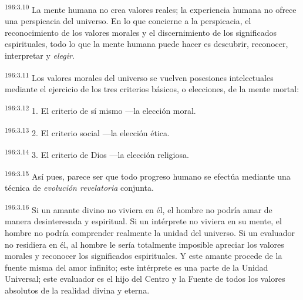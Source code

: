 \par 
\textsuperscript{196:3.10} La mente humana no crea valores reales; la experiencia humana no ofrece una perspicacia del universo. En lo que concierne a la perspicacia, el reconocimiento de los valores morales y el discernimiento de los significados espirituales, todo lo que la mente humana puede hacer es descubrir, reconocer, interpretar y \textit{elegir}.

\par 
\textsuperscript{196:3.11} Los valores morales del universo se vuelven posesiones intelectuales mediante el ejercicio de los tres criterios básicos, o elecciones, de la mente mortal:

\par 
\textsuperscript{196:3.12} 1. El criterio de sí mismo ---la elección moral.

\par 
\textsuperscript{196:3.13} 2. El criterio social ---la elección ética.

\par 
\textsuperscript{196:3.14} 3. El criterio de Dios ---la elección religiosa.

\par 
\textsuperscript{196:3.15} Así pues, parece ser que todo progreso humano se efectúa mediante una técnica de \textit{evolución revelatoria} conjunta.

\par 
\textsuperscript{196:3.16} Si un amante divino no viviera en él, el hombre no podría amar de manera desinteresada y espiritual. Si un intérprete no viviera en su mente, el hombre no podría comprender realmente la unidad del universo. Si un evaluador no residiera en él, al hombre le sería totalmente imposible apreciar los valores morales y reconocer los significados espirituales. Y este amante procede de la fuente misma del amor infinito; este intérprete es una parte de la Unidad Universal; este evaluador es el hijo del Centro y la Fuente de todos los valores absolutos de la realidad divina y eterna.

